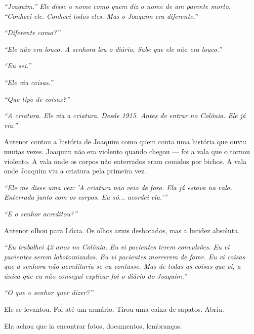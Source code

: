 \noindent \textit{\textquotedblleft{}Joaquim.\textquotedblright{}\textit{ Ele disse o nome como quem diz o nome de um parente morto. }\textquotedblleft{}Conheci ele. Conheci todos eles. Mas o Joaquim era diferente.\textquotedblright{}}

\noindent \textit{\textquotedblleft{}Diferente como?\textquotedblright{}}

\noindent \textit{\textquotedblleft{}Ele não era louco. A senhora leu o diário. Sabe que ele não era louco.\textquotedblright{}}

\noindent \textit{\textquotedblleft{}Eu sei.\textquotedblright{}}

\noindent \textit{\textquotedblleft{}Ele via coisas.\textquotedblright{}}

\noindent \textit{\textquotedblleft{}Que tipo de coisas?\textquotedblright{}}

\noindent \textit{\textquotedblleft{}A criatura. Ele via a criatura. Desde 1915. Antes de entrar no Colônia. Ele já via.\textquotedblright{}}

\noindent Antenor contou a história de Joaquim como quem conta uma história que ouviu muitas vezes. Joaquim não era violento quando chegou --- foi a vala que o tornou violento. A vala onde os corpos não enterrados eram comidos por bichos. A vala onde Joaquim viu a criatura pela primeira vez.

\noindent \textit{\textquotedblleft{}Ele me disse uma vez: 'A criatura não veio de fora. Ela já estava na vala. Enterrada junto com os corpos. Eu só... acordei ela.'\textquotedblright{}}

\noindent \textit{\textquotedblleft{}E o senhor acreditou?\textquotedblright{}}

\noindent Antenor olhou para Lúcia. Os olhos azuis desbotados, mas a lucidez absoluta.

\noindent \textit{\textquotedblleft{}Eu trabalhei 42 anos no Colônia. Eu vi pacientes terem convulsões. Eu vi pacientes serem lobotomizados. Eu vi pacientes morrerem de fome. Eu vi coisas que a senhora não acreditaria se eu contasse. Mas de todas as coisas que vi, a única que eu não consegui explicar foi o diário do Joaquim.\textquotedblright{}}

\noindent \textit{\textquotedblleft{}O que o senhor quer dizer?\textquotedblright{}}

\noindent Ele se levantou. Foi até um armário. Tirou uma caixa de sapatos. Abriu.

\noindent Ela achou que ia encontrar fotos, documentos, lembranças.

